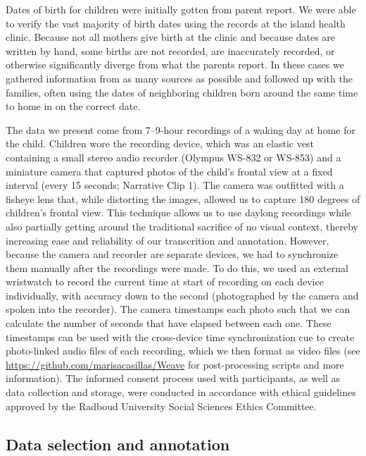 \documentclass[,man,floatsintext]{apa6}
\begin{document}
Dates of birth for children were initially gotten from parent report. We
were able to verify the vast majority of birth dates using the records
at the island health clinic. Because not all mothers give birth at the
clinic and because dates are written by hand, some births are not
recorded, are inaccurately recorded, or otherwise significantly diverge
from what the parents report. In these cases we gathered information
from as many sources as possible and followed up with the families,
often using the dates of neighboring children born around the same time
to home in on the correct date.

The data we present come from 7--9-hour recordings of a waking day at
home for the child. Children wore the recording device, which was an
elastic vest containing a small stereo audio recorder (Olympus WS-832 or
WS-853) and a miniature camera that captured photos of the child's
frontal view at a fixed interval (every 15 seconds; Narrative Clip 1).
The camera was outfitted with a fisheye lens that, while distorting the
images, allowed us to capture 180 degrees of children's frontal view.
This technique allows us to use daylong recordings while also partially
getting around the traditional sacrifice of no visual context, thereby
increasing ease and reliability of our transcrition and annotation.
However, because the camera and recorder are separate devices, we had to
synchronize them manually after the recordings were made. To do this, we
used an external wristwatch to record the current time at start of
recording on each device individually, with accuracy down to the second
(photographed by the camera and spoken into the recorder). The camera
timestamps each photo such that we can calculate the number of seconds
that have elapsed between each one. These timestamps can be used with
the cross-device time synchronization cue to create photo-linked audio
files of each recording, which we then format as video files (see
\url{https://github.com/marisacasillas/Weave} for post-processing
scripts and more information). The informed consent process used with
participants, as well as data collection and storage, were conducted in
accordance with ethical guidelines approved by the Radboud University
Social Sciences Ethics Committee.

\subsection{Data selection and annotation}\label{methods-samples}
\end{document}
